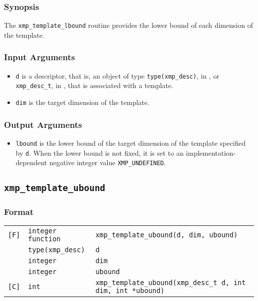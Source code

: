 \subsubsection*{Synopsis}

The {\tt xmp\_template\_lbound} routine provides the lower bound of each
dimension of the template.

\subsubsection*{Input Arguments}
\begin{itemize}
 \item {\tt d} is a descriptor, that is, an object of type 
       {\tt type(xmp\_desc)}, in {\XMPF}, or {\tt xmp\_desc\_t},
       in {\XMPC}, that is associated with a template.
 \item {\tt dim} is the target dimension of the template.
\end{itemize}

\subsubsection*{Output Arguments}
\begin{itemize}
 \item {\tt lbound} is the lower bound of the target dimension of the
       template specified by {\tt d}.  When the lower bound is not
       fixed, it is set to an implementation-dependent negative integer
       value {\tt XMP\_UNDEFINED}.
\end{itemize}


\subsection{\tt xmp\_template\_ubound}

\subsubsection*{Format}

\begin{tabular}{lll}

\verb![F]!& {\tt integer function}& {\tt xmp\_template\_ubound(d, dim, ubound)}\\
          & {\tt type(xmp\_desc)} & {\tt d}\\
          & {\tt integer} & {\tt dim}\\
          & {\tt integer} & {\tt ubound}\\

\verb![C]!&  {\tt int}& {\tt xmp\_template\_ubound(xmp\_desc\_t d, int dim, int *ubound)}\\

\end{tabular}

